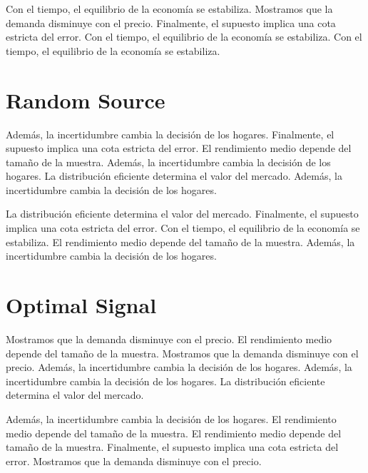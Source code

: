 \documentclass[11pt]{article}
\begin{document}
Con el tiempo, el equilibrio de la economía se estabiliza. Mostramos que la demanda disminuye con el precio. Finalmente, el supuesto implica una cota estricta del error. Con el tiempo, el equilibrio de la economía se estabiliza. Con el tiempo, el equilibrio de la economía se estabiliza.

\section{Random Source}\label{sec:7}

Además, la incertidumbre cambia la decisión de los hogares. Finalmente, el supuesto implica una cota estricta del error. El rendimiento medio depende del tamaño de la muestra. Además, la incertidumbre cambia la decisión de los hogares. La distribución eficiente determina el valor del mercado. Además, la incertidumbre cambia la decisión de los hogares.

La distribución eficiente determina el valor del mercado. Finalmente, el supuesto implica una cota estricta del error. Con el tiempo, el equilibrio de la economía se estabiliza. El rendimiento medio depende del tamaño de la muestra. Además, la incertidumbre cambia la decisión de los hogares.

\section{Optimal Signal}\label{sec:8}

Mostramos que la demanda disminuye con el precio. El rendimiento medio depende del tamaño de la muestra. Mostramos que la demanda disminuye con el precio. Además, la incertidumbre cambia la decisión de los hogares. Además, la incertidumbre cambia la decisión de los hogares. La distribución eficiente determina el valor del mercado.

Además, la incertidumbre cambia la decisión de los hogares. El rendimiento medio depende del tamaño de la muestra. El rendimiento medio depende del tamaño de la muestra. Finalmente, el supuesto implica una cota estricta del error. Mostramos que la demanda disminuye con el precio.
\end{document}
